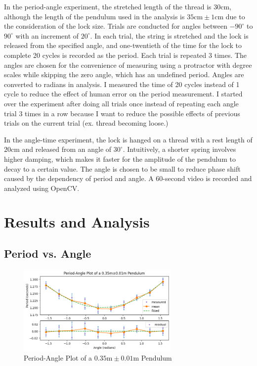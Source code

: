 \documentclass[12pt]{article}
\begin{document}
In the period-angle experiment, the stretched length of the thread is $30\mathrm{cm}$, although the length of the pendulum used in the analysis is $35\mathrm{cm}\pm1\mathrm{cm}$ due to the consideration of the lock size. Trials are conducted for angles between $-90^\circ$ to $90^\circ$ with an increment of $20^\circ$. In each trial, the string is stretched and the lock is released from the specified angle, and one-twentieth of the time for the lock to complete 20 cycles is recorded as the period. Each trial is repeated 3 times. The angles are chosen for the convenience of measuring using a protractor with degree scales while skipping the zero angle, which has an undefined period. Angles are converted to radians in analysis. I measured the time of 20 cycles instead of 1 cycle to reduce the effect of human error on the period measurement. I started over the experiment after doing all trials once instead of repeating each angle trial 3 times in a row because I want to reduce the possible effects of previous trials on the current trial (ex. thread becoming loose.)

In the angle-time experiment, the lock is hanged on a thread with a rest length of $20\mathrm{cm}$ and released from an angle of $30^\circ$. Intuitively, a shorter spring involves higher damping, which makes it faster for the amplitude of the pendulum to decay to a certain value. The angle is chosen to be small to reduce phase shift caused by the dependency of period and angle. A 60-second video is recorded and analyzed using OpenCV.


\section{Results and Analysis}

\subsection{Period vs. Angle}

\begin{figure}[!ht]
\begin{center}
\includegraphics[width=0.7\textwidth]{period-angle.png}
\end{center}
\caption{Period-Angle Plot of a $0.35\mathrm{m}\pm0.01\mathrm{m}$ Pendulum}
\label{fig:period-angle}
\end{figure}
\end{document}
